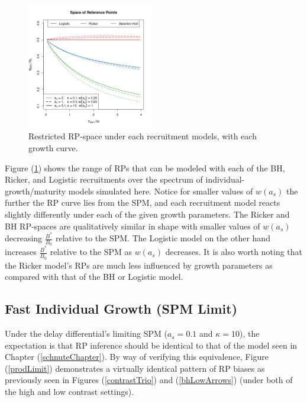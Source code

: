 %
\begin{figure}
\vspace{-0.5cm}
\includegraphics[width=0.49\textwidth]{../ddBias/rpTriptic.png}
\vspace{-0.75cm}
\caption{Restricted RP-space under each recruitment models,
with each growth curve.}\label{rpTriptic}
\end{figure}
%
Figure (\ref{rpTriptic}) shows the range of RPs that can be modeled with each
of the BH, Ricker, and Logistic recruitments over the spectrum of
individual-growth/maturity models simulated here. Notice for smaller values of 
$w(a_s)$ the further the RP curve lies from the SPM,
and each recruitment model reacts slightly differently under each of the given growth
parameters. The Ricker and BH RP-spaces are qualitatively similar in shape
with smaller values of $w(a_s)$ decreasing $\frac{B^*}{B_0}$ relative to the SPM. 
The Logistic model on the other hand increases $\frac{B^*}{B_0}$ relative to 
the SPM as $w(a_s)$ decreases. It is also worth noting that the Ricker model's
RPs are much less influenced by growth parameters as compared with that of the
BH or Logistic model.

%
\subsection{Fast Individual Growth (SPM Limit)}

%
Under the delay differential's limiting SPM ($a_s=0.1$ and $\kappa=10$),
the expectation is that RP inference should be identical to that of the model seen in
Chapter (\ref{schnuteChapter}). By way of verifying this equivalence, Figure (\ref{prodLimit})
demonstrates a virtually identical pattern of RP biases as previously seen in
Figures (\ref{contrastTrio}) and (\ref{bhLowArrows}) (under both of the high and
low contrast settings).

